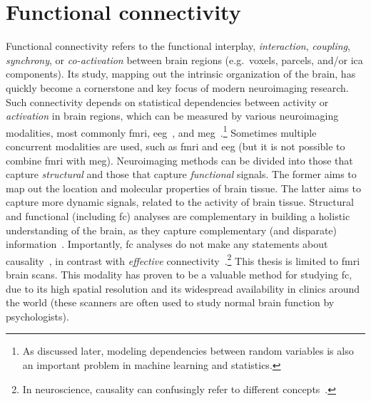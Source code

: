 \clearpage
\section{Functional connectivity}

Functional connectivity refers to the functional interplay, \emph{interaction}, \emph{coupling}, \emph{synchrony}, or \emph{co-activation} between brain regions (e.g.~voxels, parcels, and/or \gls{ica} components).
Its study, mapping out the intrinsic organization of the brain, has quickly become a cornerstone and key focus of modern neuroimaging research.
Such connectivity depends on statistical dependencies between activity or \emph{activation} in brain regions, which can be measured by various neuroimaging modalities, most commonly \gls{fmri}, \gls{eeg}~\parencite[e.g.][]{Tagliazucchi2012, Chang2013}, and \gls{meg}~\parencite[e.g.][]{Baker2014, Vidaurre2018}.\footnote{As discussed later, modeling dependencies between random variables is also an important problem in machine learning and statistics.}
Sometimes multiple concurrent modalities are used, such as \gls{fmri} and \gls{eeg} (but it is not possible to combine \gls{fmri} with \gls{meg}).
%
Neuroimaging methods can be divided into those that capture \emph{structural} and those that capture \emph{functional} signals.
The former aims to map out the location and molecular properties of brain tissue.
The latter aims to capture more dynamic signals, related to the activity of brain tissue.
Structural and functional (including \gls{fc}) analyses are complementary in building a holistic understanding of the brain, as they capture complementary (and disparate) information~\parencite{Lang2012}.
Importantly, \gls{fc} analyses do not make any statements about causality~\parencite{Mehler2018}, in contrast with \emph{effective} connectivity~\parencite{Friston2011, Smith2012b, Park2018, Zeidman2019, Zarghami2020}.\footnote{In neuroscience, causality can confusingly refer to different concepts~\parencite[see][]{Barack2022}.}
%
This thesis is limited to \gls{fmri} brain scans.
This modality has proven to be a valuable method for studying \gls{fc}, due to its high spatial resolution and its widespread availability in clinics around the world (these scanners are often used to study normal brain function by psychologists).

